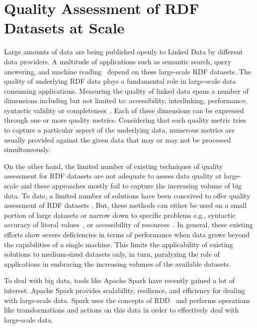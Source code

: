 \chapter{Quality Assessment of RDF Datasets at Scale}
\label{chapter:dist_quality_assessment}
Large amounts of data are being published openly to Linked Data by different data providers. 
A multitude of applications such as semantic search, query answering, and machine reading~\cite{rw2014} depend on these large-scale \gls{RDF} datasets.  
The quality of underlying \gls{RDF} data plays a fundamental role in large-scale data consuming applications. 
Measuring the quality of linked data spans a number of dimensions including but not limited to: accessibility, interlinking, performance, syntactic validity or completeness~\cite{zaveri2015quality}.
Each of these dimensions can be expressed through one or more quality metrics. 
Considering that each quality metric tries to capture a particular aspect of the underlying data, numerous metrics are usually provided against the given data that may or may not be processed simultaneously.

On the other hand, the limited number of existing techniques of quality assessment for \gls{RDF} datasets are not adequate to assess data quality at large-scale and these approaches mostly fail to capture the increasing volume of big data. 
To date, a limited number of solutions have been conceived to offer quality assessment of \gls{RDF} datasets \cite{Debattista0AC18,farber2018,beek2018,debattista2016luzzu}.
But, these methods can either be used on a small portion of large datasets \cite{farber2018} or narrow down to specific problems e.g., syntactic accuracy of literal values~\cite{beek2018}, or accessibility of resources~\cite{Mihindukulasooriya2016LDSA}.
In general, these existing efforts show severe deficiencies in terms of performance when data grows beyond the capabilities of a single machine.
This limits the applicability of existing solutions to medium-sized datasets only, in turn, paralyzing the role of applications in embracing the increasing volumes of the available datasets.

To deal with big data, tools like Apache Spark have recently gained a lot of interest. 
Apache Spark provides scalability, resilience, and efficiency for dealing with large-scale data. 
Spark uses the concepts of \gls{RDD}~\cite{zaharia2012resilient} and performs operations like transformations and actions on this data in order to effectively deal with large-scale data. 

